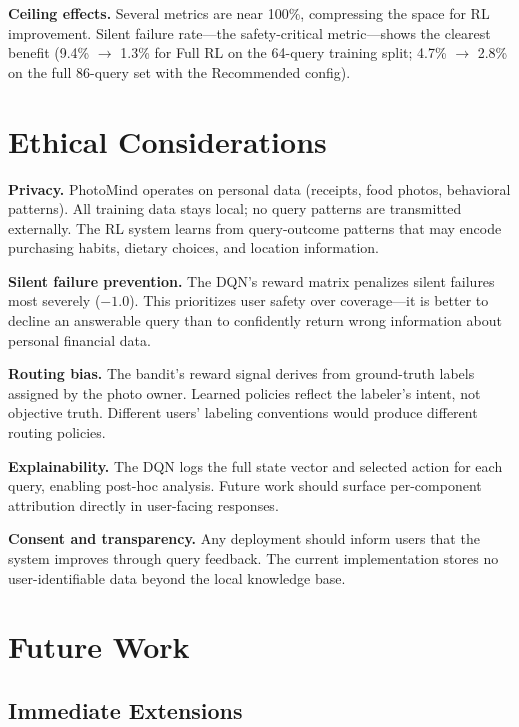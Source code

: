 \documentclass[11pt,letterpaper]{article}
\begin{document}
\textbf{Ceiling effects.} Several metrics are near 100\%, compressing the space for RL improvement. Silent failure rate---the safety-critical metric---shows the clearest benefit (9.4\% $\to$ 1.3\% for Full RL on the 64-query training split; 4.7\% $\to$ 2.8\% on the full 86-query set with the Recommended config).

\section{Ethical Considerations}
\label{sec:ethics}

\textbf{Privacy.} PhotoMind operates on personal data (receipts, food photos, behavioral patterns). All training data stays local; no query patterns are transmitted externally. The RL system learns from query-outcome patterns that may encode purchasing habits, dietary choices, and location information.

\textbf{Silent failure prevention.} The DQN's reward matrix penalizes silent failures most severely ($-1.0$). This prioritizes user safety over coverage---it is better to decline an answerable query than to confidently return wrong information about personal financial data.

\textbf{Routing bias.} The bandit's reward signal derives from ground-truth labels assigned by the photo owner. Learned policies reflect the labeler's intent, not objective truth. Different users' labeling conventions would produce different routing policies.

\textbf{Explainability.} The DQN logs the full state vector and selected action for each query, enabling post-hoc analysis. Future work should surface per-component attribution directly in user-facing responses.

\textbf{Consent and transparency.} Any deployment should inform users that the system improves through query feedback. The current implementation stores no user-identifiable data beyond the local knowledge base.

\section{Future Work}
\label{sec:future}

\subsection{Immediate Extensions}
\end{document}

